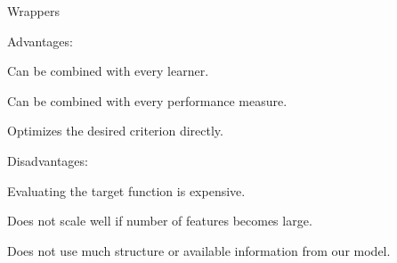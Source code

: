 \documentclass[11pt,compress,t,notes=noshow, xcolor=table]{beamer}
\begin{document}
  \begin{vbframe}{Wrappers}

    \begin{blocki}{Advantages:}
      \item Can be combined with every learner.
      \item Can be combined with every performance measure.
      \item Optimizes the desired criterion directly.
    \end{blocki}

    \lz

    \begin{blocki}{Disadvantages:}
      \item Evaluating the target function is expensive.
      \item Does not scale well if number of features becomes large.
      \item Does not use much structure or available information from our model.
    \end{blocki}

  \end{vbframe}


  \endlecture
\end{document}
